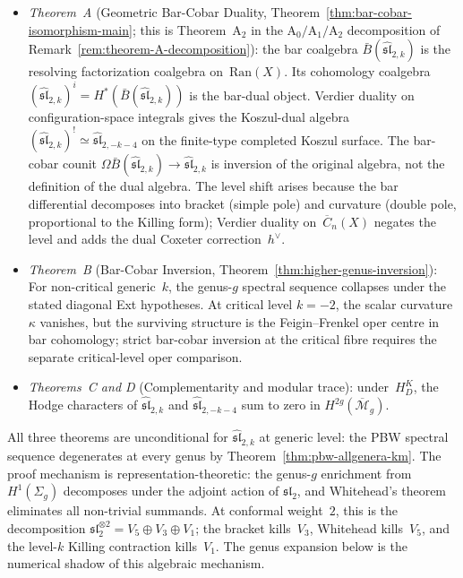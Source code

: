 \begin{itemize}
\item \emph{Theorem~A} (Geometric Bar-Cobar Duality,
Theorem~\ref{thm:bar-cobar-isomorphism-main}; this is
Theorem~$\mathrm{A}_2$ in the $\mathrm{A}_0/\mathrm{A}_1/\mathrm{A}_2$
decomposition of Remark~\ref{rem:theorem-A-decomposition}):
the bar coalgebra
$\bar{B}(\widehat{\mathfrak{sl}}_{2,k})$ is the resolving
factorization coalgebra on~$\mathrm{Ran}(X)$. Its cohomology
coalgebra
$(\widehat{\mathfrak{sl}}_{2,k})^i
=H^*(\bar{B}(\widehat{\mathfrak{sl}}_{2,k}))$
is the bar-dual object. Verdier duality on configuration-space
integrals gives the Koszul-dual algebra
$(\widehat{\mathfrak{sl}}_{2,k})^!
\simeq \widehat{\mathfrak{sl}}_{2,-k-4}$
on the finite-type completed Koszul surface. The bar-cobar counit
$\Omega\bar{B}(\widehat{\mathfrak{sl}}_{2,k})
\to \widehat{\mathfrak{sl}}_{2,k}$ is inversion of the original
algebra, not the definition of the dual algebra. The level shift
arises because the bar differential decomposes into bracket
(simple pole) and curvature (double pole, proportional to the Killing
form); Verdier duality on~$\overline{C}_n(X)$ negates the level and
adds the dual Coxeter correction~$h^\vee$.
\item \emph{Theorem~B} (Bar-Cobar Inversion, Theorem~\ref{thm:higher-genus-inversion}):
For non-critical generic~$k$, the genus-$g$ spectral sequence
collapses under the stated diagonal Ext hypotheses. At critical level
$k=-2$, the scalar curvature $\kappa$ vanishes, but the surviving
structure is the Feigin--Frenkel oper centre in bar cohomology; strict
bar-cobar inversion at the critical fibre requires the separate
critical-level oper comparison.
\item \emph{Theorems~C and D} (Complementarity and modular trace):
under~$H_D^K$, the Hodge characters of
$\widehat{\mathfrak{sl}}_{2,k}$ and
$\widehat{\mathfrak{sl}}_{2,-k-4}$ sum to zero in
$H^{2g}(\overline{\mathcal M}_g)$.
\end{itemize}

All three theorems are unconditional for $\widehat{\mathfrak{sl}}_{2,k}$
at generic level: the PBW spectral sequence degenerates at every
genus by Theorem~\ref{thm:pbw-allgenera-km}. The proof mechanism is
representation-theoretic: the genus-$g$ enrichment from
$H^1(\Sigma_g)$ decomposes under the adjoint action of
$\mathfrak{sl}_2$, and Whitehead's theorem eliminates all non-trivial
summands. At conformal weight~$2$, this is the decomposition
$\mathfrak{sl}_2^{\otimes 2} = V_5 \oplus V_3 \oplus V_1$; the
bracket kills~$V_3$, Whitehead kills~$V_5$, and the
level-$k$ Killing contraction kills~$V_1$.
The genus expansion below
is the numerical shadow of this algebraic mechanism.

